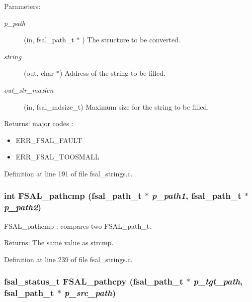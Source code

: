 \begin{Desc}
\item[Parameters:]
\begin{description}
\item[{\em p\_\-path}](in, fsal\_\-path\_\-t $\ast$ ) The structure to be converted. \item[{\em string}](out, char $\ast$) Address of the string to be filled. \item[{\em out\_\-str\_\-maxlen}](in, fsal\_\-mdsize\_\-t) Maximum size for the string to be filled.\end{description}
\end{Desc}
\begin{Desc}
\item[Returns:]major codes :\begin{itemize}
\item ERR\_\-FSAL\_\-FAULT\item ERR\_\-FSAL\_\-TOOSMALL \end{itemize}
\end{Desc}


Definition at line 191 of file fsal\_\-strings.c.
\subsubsection[{FSAL\_\-pathcmp}]{\setlength{\rightskip}{0pt plus 5cm}int FSAL\_\-pathcmp (fsal\_\-path\_\-t $\ast$ {\em p\_\-path1}, \/  fsal\_\-path\_\-t $\ast$ {\em p\_\-path2})}\label{group__FSALNameFunctions_gb505ff741d63869104f421803e18327d}


FSAL\_\-pathcmp : compares two FSAL\_\-path\_\-t.

\begin{Desc}
\item[Returns:]The same value as strcmp. \end{Desc}


Definition at line 239 of file fsal\_\-strings.c.
\subsubsection[{FSAL\_\-pathcpy}]{\setlength{\rightskip}{0pt plus 5cm}fsal\_\-status\_\-t FSAL\_\-pathcpy (fsal\_\-path\_\-t $\ast$ {\em p\_\-tgt\_\-path}, \/  fsal\_\-path\_\-t $\ast$ {\em p\_\-src\_\-path})}\label{group__FSALNameFunctions_g643b6638c1334c96bc763b195d1cf151}


